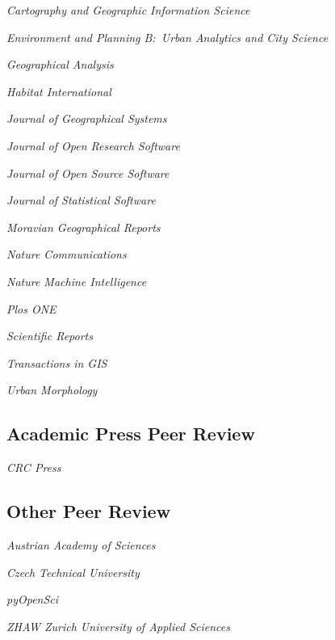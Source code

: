 \documentclass[12pt,a4paper]{report}
\newcommand{\listitemspace}{0.25em}
\renewenvironment{itemize}
{\begin{list}{}{\setlength{\leftmargin}{0em}
                \setlength{\parskip}{0em}
                \setlength{\itemsep}{\listitemspace}
                \setlength{\parsep}{\listitemspace}}}
{\end{list}}
\begin{document}
    \begin{itemize}

        \item \textit{Cartography and Geographic Information Science}
        \item \textit{Environment and Planning B:\ Urban Analytics and City Science}
        \item \textit{Geographical Analysis}
        \item \textit{Habitat International}
        \item \textit{Journal of Geographical Systems}
        \item \textit{Journal of Open Research Software}
        \item \textit{Journal of Open Source Software}
        \item \textit{Journal of Statistical Software}
        \item \textit{Moravian Geographical Reports}
        \item \textit{Nature Communications}
        \item \textit{Nature Machine Intelligence}
        \item \textit{Plos ONE}
        \item \textit{Scientific Reports}
        \item \textit{Transactions in GIS}
        \item \textit{Urban Morphology}

    \end{itemize}

    \subsection*{Academic Press Peer Review}

    \begin{itemize}

        \item \textit{CRC Press}

    \end{itemize}

    \subsection*{Other Peer Review}

    \begin{itemize}

        \item \textit{Austrian Academy of Sciences}
        \item \textit{Czech Technical University}
        \item \textit{pyOpenSci}
        \item \textit{ZHAW Zurich University of Applied Sciences}

    \end{itemize}
\end{document}
